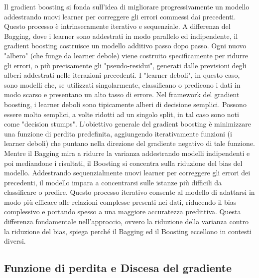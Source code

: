 \documentclass[a4paper,12pt]{report}
\begin{document}
	Il gradient boosting si fonda sull'idea di migliorare progressivamente un modello addestrando nuovi learner per correggere gli errori commessi dai precedenti. Questo processo è intrinsecamente iterativo e sequenziale. A differenza del Bagging, dove i learner sono addestrati in modo parallelo ed indipendente, il gradient boosting costruisce un modello additivo passo dopo passo. Ogni nuovo "albero" (che funge da learner debole) viene costruito specificamente per ridurre gli errori, o più precisamente gli "pseudo-residui", generati dalle previsioni degli alberi addestrati nelle iterazioni precedenti.
	I "learner deboli", in questo caso, sono modelli che, se utilizzati singolarmente, classificano o predicono i dati in modo scarso e presentano un alto tasso di errore. Nel framework del gradient boosting, i learner deboli sono tipicamente alberi di decisione semplici. Possono essere molto semplici, a volte ridotti ad un singolo split, in tal caso sono noti come "decision stumps". L'obiettivo generale del gradient boosting è minimizzare una funzione di perdita predefinita, aggiungendo iterativamente funzioni (i learner deboli) che puntano nella direzione del gradiente negativo di tale funzione. Mentre il Bagging mira a ridurre la varianza addestrando modelli indipendenti e poi mediandone i risultati, il Boosting si concentra sulla riduzione del bias del modello. Addestrando sequenzialmente nuovi learner per correggere gli errori dei precedenti, il modello impara a concentrarsi sulle istanze più difficili da classificare o predire. Questo processo iterativo consente al modello di adattarsi in modo più efficace alle relazioni complesse presenti nei dati, riducendo il bias complessivo e portando spesso a una maggiore accuratezza predittiva. Questa differenza fondamentale nell'approccio, ovvero la riduzione della varianza contro la riduzione del bias, spiega perché il Bagging ed il Boosting eccellono in contesti diversi.
	
	\subsection{Funzione di perdita e Discesa del gradiente}
	
\end{document}
